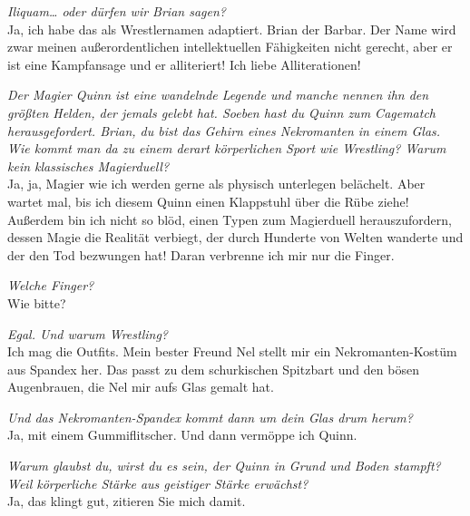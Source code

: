 \documentclass[final]{multiversum}
\begin{document}
\textit{Iliquam… oder dürfen wir Brian sagen?}\\
Ja, ich habe das als Wrestlernamen adaptiert. Brian der Barbar. Der Name wird zwar meinen außerordentlichen intellektuellen Fähigkeiten nicht gerecht, aber er ist eine Kampfansage und er alliteriert! Ich liebe Alliterationen! 

\textit{Der Magier Quinn ist eine wandelnde Legende und manche nennen ihn den größten Helden, der jemals gelebt hat. Soeben hast du Quinn zum Cagematch herausgefordert. Brian, du bist das Gehirn eines Nekromanten in einem Glas. Wie kommt man da zu einem derart körperlichen Sport wie Wrestling?  Warum kein klassisches Magierduell?}\\
Ja, ja, Magier wie ich werden gerne als physisch unterlegen belächelt. Aber wartet mal, bis ich diesem Quinn einen Klappstuhl über die Rübe ziehe! Außerdem bin ich  nicht so blöd, einen Typen zum Magierduell herauszufordern, dessen Magie die Realität verbiegt, der durch Hunderte von Welten wanderte und der den Tod bezwungen hat! Daran verbrenne ich mir nur die Finger.

\textit{Welche Finger?}\\
Wie bitte?

\textit{Egal. Und warum Wrestling?}\\
Ich mag die Outfits. Mein bester Freund Nel stellt mir ein Nekromanten-Kostüm aus Spandex her. Das passt zu dem schurkischen Spitzbart und den bösen Augenbrauen, die Nel mir aufs Glas gemalt hat.

\textit{Und das Nekromanten-Spandex kommt dann um dein Glas drum herum?}\\
Ja, mit einem Gummiflitscher. Und dann vermöppe ich Quinn. 

\textit{Warum glaubst du, wirst du es sein, der Quinn in Grund und Boden stampft? Weil körperliche Stärke aus geistiger Stärke erwächst?}\\
Ja, das klingt gut, zitieren Sie mich damit.
\end{document}
